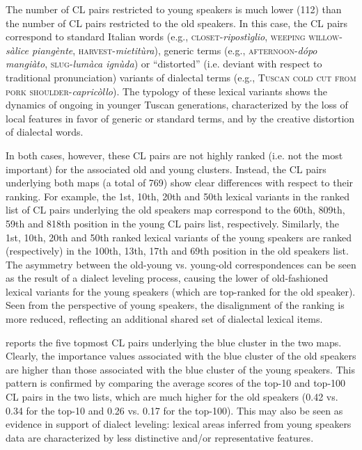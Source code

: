 \documentclass[output=paper]{LSP/langsci}
\begin{document}
The number of CL pairs restricted to young speakers is much lower (112) than the number of CL pairs restricted to the old speakers. In this case, the CL pairs correspond to standard Italian words (e.g., \textsc{closet}{}-\textit{ripostìglio}, \textsc{weeping willow}{}-\textit{sàlice piangènte}, \textsc{harvest}{}-\textit{mietitùra}), generic terms (e.g., \textsc{afternoon}{}-\textit{dópo mangiàto}, \textsc{slug}{}-\textit{lumàca ignùda}) or “distorted” (i.e. deviant with respect to traditional pronunciation) variants of dialectal terms (e.g., \textsc{Tuscan cold cut from pork shoulder}{}-\textit{capricòllo}). The typology of these lexical variants shows the dynamics of  ongoing in younger Tuscan generations, characterized by the loss of local features in favor of generic or standard terms, and by the creative distortion of dialectal words. 

In both cases, however, these CL pairs are not highly ranked (i.e. not the most important) for the associated old and young clusters. Instead, the CL pairs underlying both maps (a total of 769) show clear differences with respect to their ranking. For example, the 1st, 10th, 20th and 50th lexical variants in the ranked list of CL pairs underlying the old speakers map correspond to the 60th, 809th, 59th and 818th position in the young CL pairs list, respectively. Similarly, the 1st, 10th, 20th and 50th ranked lexical variants of the young speakers are ranked (respectively) in the 100th, 13th, 17th and 69th position in the old speakers list. The asymmetry between the old-young vs. young-old correspondences can be seen as the result of a dialect leveling process, causing the lower  of old-fashioned lexical variants for the young speakers (which are top-ranked for the old speaker). Seen from the perspective of young speakers, the disalignment of the ranking is more reduced, reflecting an additional shared set of dialectal lexical items.

 reports the five topmost CL pairs underlying the blue cluster in the two maps. Clearly, the importance values associated with the blue cluster of the old speakers are higher than those associated with the blue cluster of the young speakers. This pattern is confirmed by comparing the average  scores of the top-10 and top-100 CL pairs in the two lists, which are much higher for the old speakers (0.42 vs. 0.34 for the top-10 and 0.26 vs. 0.17 for the top-100). This may also be seen as evidence in support of dialect leveling: lexical areas inferred from young speakers data are characterized by less distinctive and/or representative features. 
\end{document}
